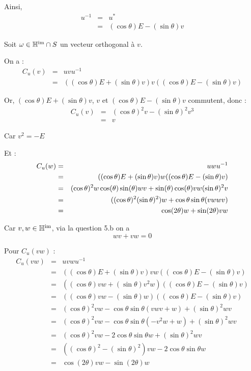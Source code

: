 Ainsi,
\begin{eqnarray*}
  u^{- 1} & = & u^{\ast}\\
  & = & (\cos \theta) E - (\sin \theta) v
\end{eqnarray*}


 Soit $\omega \in \mathbb{H}^{\tmop{im}} \cap S$ un vecteur
orthogonal {\`a} $v$.

On a :
\begin{eqnarray*}
  C_u (v) & = & u v u^{- 1}\\
  & = & ((\cos \theta) E + (\sin \theta) v) v ((\cos \theta) E - (\sin
  \theta) v)
\end{eqnarray*}


Or, $(\cos \theta) E + (\sin \theta) v$, $v$ et $(\cos \theta) E - (\sin
\theta) v$ commutent, donc :
\begin{eqnarray*}
  C_u (v) & = & (\cos \theta)^2 v - (\sin \theta)^2 v^3\\
  & = & v
\end{eqnarray*}


Car $v^2 = - E$

Et :
\begin{eqnarray*}
  C_u (w) & = & u w u^{- 1}\\
  & = & ((\cos \theta) E + (\sin \theta) v) w ((\cos \theta) E - (\sin
  \theta) v)\\
  & = & (\cos \theta)^2 w \nonconverted{minus} \cos (\theta) \sin (\theta) w
  v + \sin (\theta) \cos (\theta) v w \nonconverted{minus} (\sin \theta)^2 v\\
  & = & ((\cos \theta)^2 \nonconverted{minus} (\sin \theta)^2) w + \cos
  \theta \sin \theta (v w \nonconverted{minus} w v)\\
  & = & \cos (2 \theta) w + \sin (2 \theta) v w
\end{eqnarray*}


Car $v, w \in \mathbb{H}^{\tmop{im}}$, via la question 5.b on a
\[ w v + v w = 0 \]


Pour $C_u (v w)$ :
\[ \begin{array}{lll}
     C_u (v w) & = & u v w u^{- 1}\\
     & = & ((\cos \theta) E + (\sin \theta) v) v w ((\cos \theta) E - (\sin
     \theta) v)\\
     & = & ((\cos \theta) v w + (\sin \theta) v^2 w) ((\cos \theta) E - (\sin
     \theta) v)\\
     & = & ((\cos \theta) v w - (\sin \theta) w) ((\cos \theta) E - (\sin
     \theta) v)\\
     & = & (\cos \theta)^2 v w - \cos \theta \sin \theta (v w v + w) + (\sin
     \theta)^2 w v\\
     & = & (\cos \theta)^2 v w - \cos \theta \sin \theta (- v^2 w + w) +
     (\sin \theta)^2 w v\\
     & = & (\cos \theta)^2 v w - 2 \cos \theta \sin \theta w + (\sin
     \theta)^2 w v\\
     & = & ((\cos \theta)^2 - (\sin \theta)^2) v w - 2 \cos \theta \sin
     \theta w\\
     & = & \cos (2 \theta) v w - \sin (2 \theta) w
   \end{array} \]


